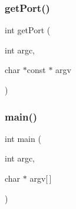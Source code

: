\subsubsection{\texorpdfstring{getPort()}{getPort()}}
{\footnotesize\ttfamily int get\+Port (\begin{DoxyParamCaption}\item[{int}]{argc,  }\item[{char $\ast$const $\ast$}]{argv }\end{DoxyParamCaption})}

\mbox{\label{7-serwer_8c_a0ddf1224851353fc92bfbff6f499fa97}} 
\subsubsection{\texorpdfstring{main()}{main()}}
{\footnotesize\ttfamily int main (\begin{DoxyParamCaption}\item[{int}]{argc,  }\item[{char $\ast$}]{argv\mbox{[}$\,$\mbox{]} }\end{DoxyParamCaption})}

